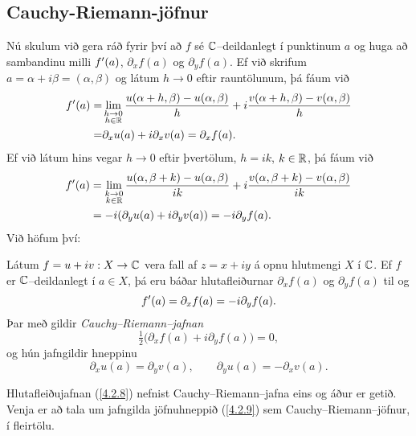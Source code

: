 \subsection*{Cauchy-Riemann-jöfnur}

Nú skulum við gera ráð fyrir því að $f$ sé ${\mathbb C}$--deildanlegt í punktinum
$a$ og huga að sambandinu milli $f{\sp{\prime}}(a)$, ${\partial}_xf(a)$ og
${\partial}_yf(a)$. 
Ef við skrifum $a=\alpha+i\beta=(\alpha, \beta)$ og látum $h\to
0$ eftir  rauntölunum, þá fáum við 
\begin{align*}
f{\sp{\prime}}(a)=&\lim_{\substack{h\to 0\\ h\in {\mathbb R}}}
\dfrac{u(\alpha+h,\beta)-u(\alpha,\beta)}h+i
\dfrac{v(\alpha+h,\beta)-v(\alpha,\beta)}h\\
=&\partial_xu(a)+i\partial_xv(a)=\partial_xf(a).\nonumber
\end{align*}
Ef við látum hins vegar $h\to 0$ eftir þvertölum, $h=ik$,
$k\in {\mathbb R}$, þá fáum við
\begin{align*}
f{\sp{\prime}}(a)&=\lim_{\substack{k\to 0\\ k\in {\mathbb R}}}
\dfrac{u(\alpha,\beta+k)-u(\alpha,\beta)}{ik}+i
\dfrac{v(\alpha,\beta+k)-v(\alpha,\beta)}{ik}\\
&=-i(\partial_yu(a)+i\partial_yv(a))=-i\partial_yf(a).\nonumber
\end{align*}
Við höfum því:  

\begin{se}\label{set4.2.8}  Látum $f=u+iv:X\to {\mathbb C}$ vera fall af $z=x+iy$ á opnu hlutmengi
$X$ í ${\mathbb C}$.  Ef $f$ er ${\mathbb C}$--deildanlegt í $a\in X$, þá eru báðar
hlutafleiðurnar $\partial_xf(a)$ og $\partial_yf(a)$ til og
 \begin{equation*}f{\sp{\prime}}(a)=\partial_xf(a)=-i\partial_yf(a).
\label{4.2.7}
 \end{equation*}
Þar með gildir {\it
Cauchy--Riemann--jafnan
}
\begin{equation}
\tfrac 12\big(\partial_xf(a)+i\partial_yf(a)\big)=0,
\label{4.2.8}
\end{equation}
og  hún jafngildir hneppinu
\begin{equation}\partial_xu(a)=\partial_yv(a), \qquad \partial_yu(a)=-\partial_xv(a).
\label{4.2.9}
\end{equation}
\end{se}


Hlutafleiðujafnan (\ref{4.2.8}) nefnist Cauchy--Riemann--jafna eins og
áður er getið.  Venja er að tala um jafngilda 
jöfnuhneppið (\ref{4.2.9}) sem  Cauchy--Riemann--jöfnur, í fleirtölu.


